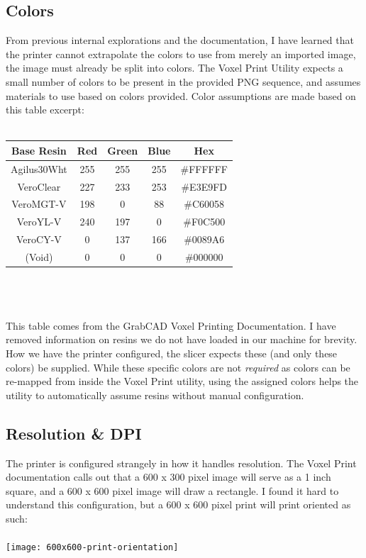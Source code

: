 \documentclass{article}
\begin{document}
\begin{multicols}{2}
\subsection{Colors} From previous internal explorations and the documentation, I have learned that the printer cannot extrapolate the colors to use from merely an imported image, the image must already be split into colors. The Voxel Print Utility expects a small number of colors to be present in the provided PNG sequence, and assumes materials to use based on colors provided. Color assumptions are made based on this table excerpt:
\\\\
\noindent
\begin{tabular}{|c||c|c|c||c|}
    \hline
    Base Resin & Red & Green & Blue & Hex \\
    \hline
    Agilus30Wht & 255 & 255 & 255 & \#FFFFFF \\
    VeroClear & 227 & 233 & 253 & \#E3E9FD \\
    VeroMGT-V & 198 & 0 & 88 & \#C60058 \\
    VeroYL-V & 240 & 197 & 0 & \#F0C500 \\
    VeroCY-V & 0 & 137 & 166 & \#0089A6 \\
    (Void) & 0 & 0 & 0 & \#000000 \\
    \hline
\end{tabular}
\\\\\\
\noindent
This table comes from the GrabCAD Voxel Printing Documentation. I have removed information on resins we do not have loaded in our machine for brevity. How we have the printer configured, the slicer expects these (and only these colors) be supplied. While these specific colors are not \textit{required} as colors can be re-mapped from inside the Voxel Print utility, using the assigned colors helps the utility to automatically assume resins without manual configuration. 

\subsection{Resolution \& DPI}
The printer is configured strangely in how it handles resolution. The Voxel Print documentation calls out that a 600 x 300 pixel image will serve as a 1 inch square, and a 600 x 600 pixel image will draw a rectangle. I found it hard to understand this configuration, but a 600 x 600 pixel print will print oriented as such:
\\\\
\texttt{[image: 600x600-print-orientation]}


\end{multicols}
\end{document}
